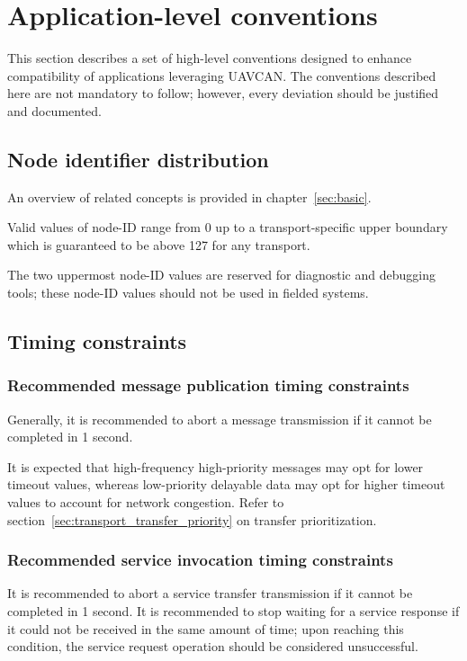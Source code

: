 \section{Application-level conventions}\label{sec:application_conventions}

This section describes a set of high-level conventions designed to enhance compatibility
of applications leveraging UAVCAN.
The conventions described here are not mandatory to follow;
however, every deviation should be justified and documented.

\subsection{Node identifier distribution}

An overview of related concepts is provided in chapter~\ref{sec:basic}.

Valid values of node-ID range from 0 up to a transport-specific upper boundary
which is guaranteed to be above 127 for any transport.

The two uppermost node-ID values are reserved for diagnostic and debugging tools;
these node-ID values should not be used in fielded systems.

\subsection{Timing constraints}

\subsubsection{Recommended message publication timing constraints}

Generally, it is recommended to abort a message transmission if it cannot be completed in 1 second.

It is expected that high-frequency high-priority messages may opt for lower timeout values,
whereas low-priority delayable data may opt for higher timeout values to account for network congestion.
Refer to section~\ref{sec:transport_transfer_priority} on transfer prioritization.

\subsubsection{Recommended service invocation timing constraints}

It is recommended to abort a service transfer transmission if it cannot be completed in 1 second.
It is recommended to stop waiting for a service response if it could not be received in the same amount of time;
upon reaching this condition, the service request operation should be considered unsuccessful.

